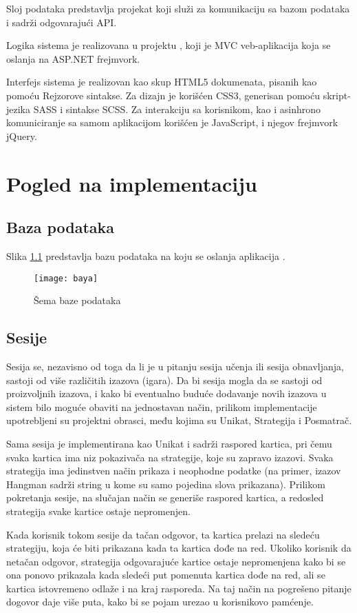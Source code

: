 Sloj podataka predstavlja projekat  koji služi za komunikaciju sa bazom podataka i sadrži odgovarajući API.

Logika sistema je realizovana u projektu , koji je MVC veb-aplikacija koja se oslanja na ASP.NET frejmvork.

Interfejs sistema je realizovan kao skup HTML5 dokumenata, pisanih kao  pomoću Rejzorove sintakse.
Za dizajn je korišćen CSS3, generisan pomoću skript-jezika SASS i sintakse SCSS.
Za interakciju sa korisnikom, kao i asinhrono komuniciranje sa samom aplikacijom korišćen je JavaScript, i njegov frejmvork jQuery.

\chapter{Pogled na implementaciju}

\section{Baza podataka}
Slika \ref{fig:sema-baza} predstavlja bazu podataka na koju se oslanja aplikacija \UpamtiOnline.

\begin{figure}[htbp]
  \centering
  \texttt{[image: baya]}
  \caption{Šema baze podataka}
  \label{fig:sema-baza}
\end{figure}

\section{Sesije}
Sesija se, nezavisno od toga da li je u pitanju sesija učenja ili sesija obnavljanja, sastoji od više različitih izazova (igara).
Da bi sesija mogla da se sastoji od proizvoljnih izazova, i kako bi eventualno buduće dodavanje novih izazova u sistem bilo moguće obaviti na jednostavan način, prilikom implementacije upotrebljeni su projektni obrasci, među kojima su Unikat, Strategija i Posmatrač.

Sama sesija je implementirana kao Unikat i sadrži raspored kartica, pri čemu svaka kartica ima niz pokazivača na strategije, koje su zapravo izazovi.
Svaka strategija ima jedinstven način prikaza i neophodne podatke (na primer, izazov Hangman sadrži string u kome su samo pojedina slova prikazana).
Prilikom pokretanja sesije, na slučajan način se generiše raspored kartica, a redosled strategija svake kartice ostaje nepromenjen.

Kada korisnik tokom sesije da tačan odgovor, ta kartica prelazi na sledeću strategiju, koja će biti prikazana kada ta kartica dođe na red.
Ukoliko korisnik da netačan odgovor, strategija odgovarajuće kartice ostaje nepromenjena kako bi se ona ponovo prikazala kada sledeći put pomenuta kartica dođe na red, ali se kartica istovremeno odlaže i na kraj rasporeda.
Na taj način na pogrešeno pitanje dogovor daje više puta, kako bi se pojam urezao u korisnikovo pamćenje.
